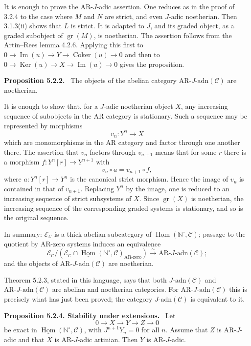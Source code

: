 \documentclass[12pt]{article}
\newcommand{\bN}{\mathbb N}
\newcommand{\cC}{\mathcal C}
\newcommand{\cE}{\mathcal E}
\newcommand{\Hom}{\operatorname{Hom}}
\newcommand{\Ker}{\operatorname{Ker}}
\newcommand{\Coker}{\operatorname{Coker}}
\newcommand{\Imn}{\operatorname{Im}}
\newcommand{\gr}{\operatorname{gr}}
\newcommand{\adn}{\mathrm{adn}}
\newcommand{\AR}{\mathrm{AR}}
\newenvironment{statement}[1]{\par\medskip\noindent\textbf{#1.}\ }{\par\medskip}
\begin{document}
It is enough to prove the AR-$J$-adic assertion. One reduces as in the proof of
3.2.4 to the case where $M$ and $N$ are strict, and even $J$-adic noetherian. Then
3.1.3(ii) shows that $L$ is strict. It is adapted to $J$, and its graded object, as
a graded subobject of $\gr(M)$, is noetherian. The assertion follows from the
Artin--Rees lemma 4.2.6. Applying this first to
$0\to\Imn(u)\to Y\to\Coker(u)\to0$ and then to
$0\to\Ker(u)\to X\to\Imn(u)\to0$ gives the proposition.

\begin{statement}{Proposition 5.2.2}
The objects of the abelian category $\AR\text{-}J\text{-}\adn(\cC)$ are noetherian.
\end{statement}

It is enough to show that, for a $J$-adic noetherian object $X$, any increasing
sequence of subobjects in the AR category is stationary. Such a sequence may be
represented by morphisms
\[
      v_n:Y^n\longrightarrow X
\]
which are monomorphisms in the AR category and factor through one another there.
The assertion that $v_n$ factors through $v_{n+1}$ means that for some $r$ there is
a morphism $f:Y^n[r]\to Y^{n+1}$ with
\[
      v_n\circ a=v_{n+1}\circ f,
\]
where $a:Y^n[r]\to Y^n$ is the canonical strict morphism. Hence the image of
$v_n$ is contained in that of $v_{n+1}$. Replacing $Y^n$ by the image, one is
reduced to an increasing sequence of strict subsystems of $X$. Since $\gr(X)$ is
noetherian, the increasing sequence of the corresponding graded systems is
stationary, and so is the original sequence.

In summary: $\cE_\cC$ is a thick abelian subcategory of
$\underline{\Hom}(\bN^\circ,\cC)$; passage to the quotient by AR-zero systems
induces an equivalence
\[
\cE_\cC/(\cE_\cC\cap\underline{\Hom}(\bN^\circ,\cC)_{\AR\text{-zero}})
\xrightarrow{\sim}
\AR\text{-}J\text{-}\adn(\cC);
\]
and the objects of $\AR\text{-}J\text{-}\adn(\cC)$ are noetherian.

Theorem 5.2.3, stated in this language, says that both
$J\text{-}\adn(\cC)$ and $\AR\text{-}J\text{-}\adn(\cC)$ are abelian and noetherian
categories. For $\AR\text{-}J\text{-}\adn(\cC)$ this is precisely what has just been
proved; the category $J\text{-}\adn(\cC)$ is equivalent to it.

\begin{statement}{Proposition 5.2.4. Stability under extensions}
Let
\[
       0\to X\to Y\to Z\to0
\]
be exact in $\underline{\Hom}(\bN^\circ,\cC)$, with $J^{n+1}Y_n=0$ for all $n$.
Assume that $Z$ is AR-$J$-adic and that $X$ is AR-$J$-adic artinian. Then $Y$ is
AR-$J$-adic.
\end{statement}
\end{document}
